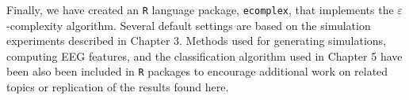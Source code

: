 Finally, we have created an \texttt{R} language package, 
\texttt{ecomplex}, that implements 
the $\varepsilon$-complexity algorithm. Several 
default settings are based on the simulation 
experiments described in Chapter 3. Methods used 
for generating simulations, computing EEG features, 
and the classification algorithm used in Chapter 5 
have been also been included in \texttt{R} 
packages to encourage additional work on related 
topics or replication of the results found here.






